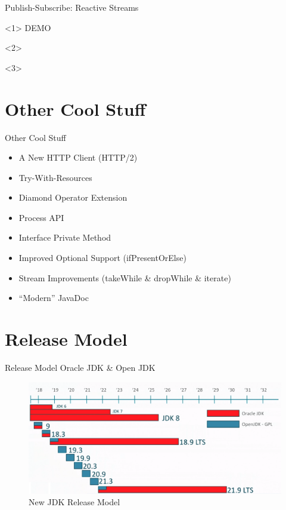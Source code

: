 \begin{frame}[fragile]{Publish-Subscribe: Reactive Streams}
\begin{onlyenv}<1>
	\fontsize{20}{0}\selectfont
	\hfill DEMO \hfill
\end{onlyenv}
\begin{onlyenv}<2>
	
\end{onlyenv}
\begin{onlyenv}<3>

\end{onlyenv}
\end{frame}

\section{Other Cool Stuff}

\begin{frame}{Other Cool Stuff}
	\begin{itemize}
		\item A New HTTP Client (HTTP/2)
		\item Try-With-Resources
		\item Diamond Operator Extension
		\item Process API
		\item Interface Private Method
		\item Improved Optional Support (ifPresentOrElse)
		\item Stream Improvements (takeWhile \& dropWhile \& iterate)
		\item \enquote{Modern} JavaDoc
	\end{itemize}
\end{frame}

\section{Release Model}

\begin{frame}{Release Model}
	Oracle JDK \& Open JDK
	\begin{figure}[h]
		\centering
		\includegraphics[width=\textwidth]{./figures/releaseModel.png}
		\caption{New JDK Release Model}
	\end{figure}
\end{frame}

